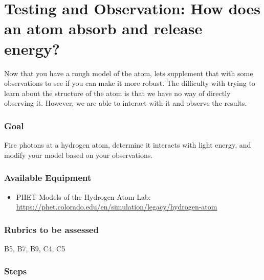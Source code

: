\section{Testing and Observation: How does an atom absorb and release energy?} 

Now that you have a rough model of the atom, lets supplement that with some observations to see if you can make it more robust. The difficulty with trying to learn about the structure of the atom is that we have no way of directly observing it. However, we are able to interact with it and observe the results.

\subsubsection{Goal}
Fire photons at a hydrogen atom, determine it interacts with light energy, and modify your model based on your observations.

\subsubsection{Available Equipment}

\begin{itemize}
	\item PHET Models of the Hydrogen Atom Lab: \url{https://phet.colorado.edu/en/simulation/legacy/hydrogen-atom}
\end{itemize}

\subsubsection{Rubrics to be assessed}

B5, B7, B9, C4, C5

\subsubsection{Steps}


